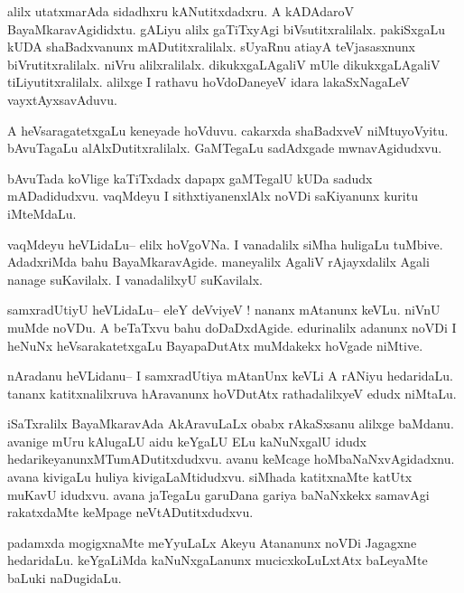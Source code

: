 \documentclass{article}
\begin{document}
\begin{mn}%
alilx utatxmarAda sidadhxru kANutitxdadxru. A kADAdaroV BayaMkaravAgididxtu. gALiyu alilx 
gaTiTxyAgi biVsutitxralilalx. pakiSxgaLu kUDA shaBadxvanunx mADutitxralilalx. sUyaRnu 
atiayA teVjasasxnunx biVrutitxralilalx. niVru alilxralilalx. dikukxgaLAgaliV mUle 
dikukxgaLAgaliV tiLiyutitxralilalx. alilxge I rathavu hoVdoDaneyeV idara lakaSxNagaLeV 
vayxtAyxsavAduvu.
\end{mn}

\begin{mn}%
A heVsaragatetxgaLu keneyade hoVduvu. cakarxda shaBadxveV niMtuyoVyitu. bAvuTagaLu 
alAlxDutitxralilalx. GaMTegaLu sadAdxgade mwnavAgidudxvu.
\end{mn}

\begin{mn}%
bAvuTada koVlige kaTiTxdadx dapapx gaMTegalU kUDa sadudx mADadidudxvu. vaqMdeyu I 
sithxtiyanenxlAlx noVDi saKiyanunx kuritu iMteMdaLu.
\end{mn}

\begin{mn}%
vaqMdeyu heVLidaLu-- elilx hoVgoVNa. I vanadalilx siMha huligaLu tuMbive. AdadxriMda bahu 
BayaMkaravAgide. maneyalilx AgaliV rAjayxdalilx Agali nanage suKavilalx. I vanadalilxyU 
suKavilalx.
\end{mn}

\begin{mn}%
samxradUtiyU heVLidaLu-- eleY deVviyeV ! nananx mAtanunx keVLu. niVnU muMde noVDu. A 
beTaTxvu bahu doDaDxdAgide. edurinalilx adanunx noVDi I heNuNx heVsarakatetxgaLu 
BayapaDutAtx muMdakekx hoVgade niMtive.
\end{mn}

\begin{mn}%
nAradanu heVLidanu-- I samxradUtiya mAtanUnx keVLi A rANiyu hedaridaLu. tananx 
katitxnalilxruva hAravanunx hoVDutAtx rathadalilxyeV edudx niMtaLu.
\end{mn}

\begin{mn}%
iSaTxralilx BayaMkaravAda AkAravuLaLx obabx rAkaSxsanu alilxge baMdanu. avanige mUru 
kAlugaLU aidu keYgaLU ELu kaNuNxgalU idudx hedarikeyanunxMTumADutitxdudxvu. avanu keMcage 
hoMbaNaNxvAgidadxnu. avana kivigaLu huliya kivigaLaMtidudxvu. siMhada katitxnaMte katUtx 
muKavU idudxvu. avana jaTegaLu garuDana gariya baNaNxkekx samavAgi rakatxdaMte keMpage 
neVtADutitxdudxvu.
\end{mn}

\begin{mn}%
padamxda mogigxnaMte meYyuLaLx Akeyu Atananunx noVDi Jagagxne hedaridaLu. keYgaLiMda 
kaNuNxgaLanunx mucicxkoLuLxtAtx baLeyaMte baLuki naDugidaLu.
\end{mn}
\end{document}
